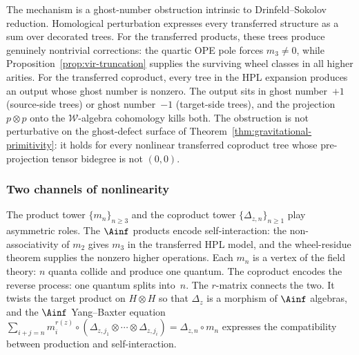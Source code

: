 The mechanism is a ghost-number obstruction intrinsic to
Drinfeld--Sokolov reduction. Homological perturbation
expresses every transferred structure as a sum over decorated
trees. For the transferred products, these trees produce
genuinely nontrivial corrections: the quartic OPE pole forces
$m_3 \ne 0$, while Proposition~\ref{prop:vir-truncation} supplies the
surviving wheel classes in all higher arities. For the transferred
coproduct, every tree in the HPL expansion produces an output
whose ghost number is nonzero. The output sits in ghost
number~$+1$ (source-side trees) or ghost number~$-1$
(target-side trees), and the projection $p \otimes p$ onto the
$\mathcal{W}$-algebra cohomology kills both. The obstruction
is not perturbative on the ghost-defect surface of
Theorem~\ref{thm:gravitational-primitivity}: it holds for every
nonlinear transferred coproduct tree whose pre-projection tensor
bidegree is not \((0,0)\).

\subsubsection*{Two channels of nonlinearity}
\label{par:ghost-number-mechanism}

The product tower $\{m_n\}_{n \ge 3}$ and the coproduct tower
$\{\Delta_{z,n}\}_{n \ge 1}$ play asymmetric roles. The
$\Ainf$ products encode self-interaction: the
non-associativity of $m_2$ gives $m_3$ in the transferred HPL
model, and the wheel-residue theorem supplies the nonzero
higher operations. Each $m_n$ is a vertex of the field theory:
$n$ quanta collide and produce one quantum. The coproduct
encodes the reverse process: one quantum splits into~$n$.
The $r$-matrix connects the two. It twists the target product
on $H \otimes H$ so that $\Delta_z$ is a morphism of $\Ainf$
algebras, and the $\Ainf$ Yang--Baxter equation
$\sum_{i+j=n} m_i^{r(z)} \circ (\Delta_{z,j_1} \otimes
\cdots \otimes \Delta_{z,j_i}) = \Delta_{z,n} \circ m_n$
expresses the compatibility between production and
self-interaction.

